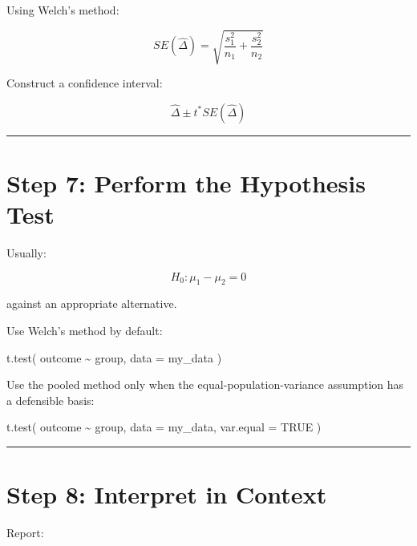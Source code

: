 \documentclass[
  letterpaper,
  DIV=11,
  numbers=noendperiod]{scrreprt}
\newenvironment{Shaded}{\begin{snugshade}}{\end{snugshade}}
\newcommand{\AttributeTok}[1]{\textcolor[rgb]{0.40,0.45,0.13}{#1}}
\newcommand{\ConstantTok}[1]{\textcolor[rgb]{0.56,0.35,0.01}{#1}}
\newcommand{\FunctionTok}[1]{\textcolor[rgb]{0.28,0.35,0.67}{#1}}
\newcommand{\NormalTok}[1]{\textcolor[rgb]{0.00,0.23,0.31}{#1}}
\newcommand{\SpecialCharTok}[1]{\textcolor[rgb]{0.37,0.37,0.37}{#1}}
\begin{document}
Using Welch's method:

\[
SE(\hat{\Delta})
=
\sqrt{
\frac{s_1^2}{n_1}
+
\frac{s_2^2}{n_2}
}
\]

Construct a confidence interval:

\[
\hat{\Delta}
\pm
t^*SE(\hat{\Delta})
\]

\begin{center}\rule{0.5\linewidth}{0.5pt}\end{center}

\section{Step 7: Perform the Hypothesis
Test}\label{step-7-perform-the-hypothesis-test}

Usually:

\[
H_0:\mu_1-\mu_2=0
\]

against an appropriate alternative.

Use Welch's method by default:

\begin{Shaded}
\begin{Highlighting}[]
\FunctionTok{t.test}\NormalTok{(}
\NormalTok{    outcome }\SpecialCharTok{\textasciitilde{}}\NormalTok{ group,}
    \AttributeTok{data =}\NormalTok{ my\_data}
\NormalTok{)}
\end{Highlighting}
\end{Shaded}

Use the pooled method only when the equal-population-variance assumption
has a defensible basis:

\begin{Shaded}
\begin{Highlighting}[]
\FunctionTok{t.test}\NormalTok{(}
\NormalTok{    outcome }\SpecialCharTok{\textasciitilde{}}\NormalTok{ group,}
    \AttributeTok{data =}\NormalTok{ my\_data,}
    \AttributeTok{var.equal =} \ConstantTok{TRUE}
\NormalTok{)}
\end{Highlighting}
\end{Shaded}

\begin{center}\rule{0.5\linewidth}{0.5pt}\end{center}

\section{Step 8: Interpret in
Context}\label{step-8-interpret-in-context}

Report:
\end{document}
